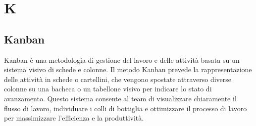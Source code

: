 \section{K}

\vspace{2em}
\subsection*{Kanban}
\par Kanban è una metodologia di gestione del lavoro e delle attività basata su un sistema visivo di schede e colonne. Il metodo Kanban prevede la rappresentazione delle attività in schede o cartellini, che vengono spostate attraverso diverse colonne su una bacheca o un tabellone visivo per indicare lo stato di avanzamento. Questo sistema consente al team di visualizzare chiaramente il flusso di lavoro, individuare i colli di bottiglia e ottimizzare il processo di lavoro per massimizzare l'efficienza e la produttività.



